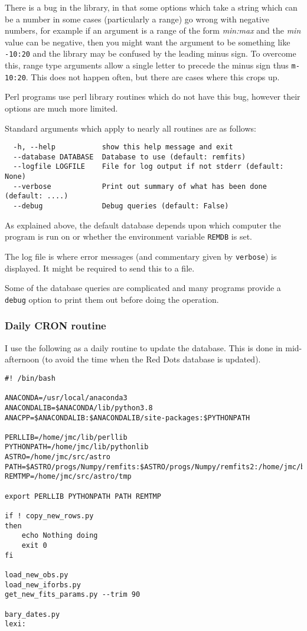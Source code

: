 \bomb There is a bug in the library, in that some options which take a string
which can be a number in some cases (particularly a range) go wrong with negative
numbers, for example if an argument is a range of the form
\textit{min:max} and the \textit{min} value can be negative, then you might want
the argument to be something like  \texttt{-10:20} and the library may be
confused by the leading minus sign. To overcome this, range type arguments allow
a single letter to precede the minus sign thus \texttt{m-10:20}. This does not
happen often, but there are cases where this crops up.

Perl programs use perl library routines which do not have this bug, however
their options are much more limited.

Standard arguments which apply to nearly all routines are as follows:

\begin{verbatim}
  -h, --help           show this help message and exit
  --database DATABASE  Database to use (default: remfits)
  --logfile LOGFILE    File for log output if not stderr (default: None)
  --verbose            Print out summary of what has been done (default: ....)
  --debug              Debug queries (default: False)
\end{verbatim}

As explained above, the default database depends upon which computer the program
is run on or whether the environment variable \texttt{REMDB} is set.

The log file is where error messages (and commentary given by
\texttt{\dmin verbose}) is displayed. It might be required to send this to a file.

Some of the database queries are complicated and many programs provide a
\texttt{\dmin debug} option to print them out before doing the operation.

\subsubsection{Daily CRON routine}
\protect\label{section:cronroutine}

I use the following as a daily routine to update the database. This is done in
mid-afternoon (to avoid the time when the Red Dots database is updated).

\begin{verbatim}
#! /bin/bash

ANACONDA=/usr/local/anaconda3
ANACONDALIB=$ANACONDA/lib/python3.8
ANACPP=$ANACONDALIB:$ANACONDALIB/site-packages:$PYTHONPATH

PERLLIB=/home/jmc/lib/perllib
PYTHONPATH=/home/jmc/lib/pythonlib
ASTRO=/home/jmc/src/astro
PATH=$ASTRO/progs/Numpy/remfits:$ASTRO/progs/Numpy/remfits2:/home/jmc/bin:$ASTRO/bin:$PATH
REMTMP=/home/jmc/src/astro/tmp

export PERLLIB PYTHONPATH PATH REMTMP

if ! copy_new_rows.py
then
	echo Nothing doing
	exit 0
fi

load_new_obs.py
load_new_iforbs.py
get_new_fits_params.py --trim 90

bary_dates.py
lexi:

\end{verbatim}

